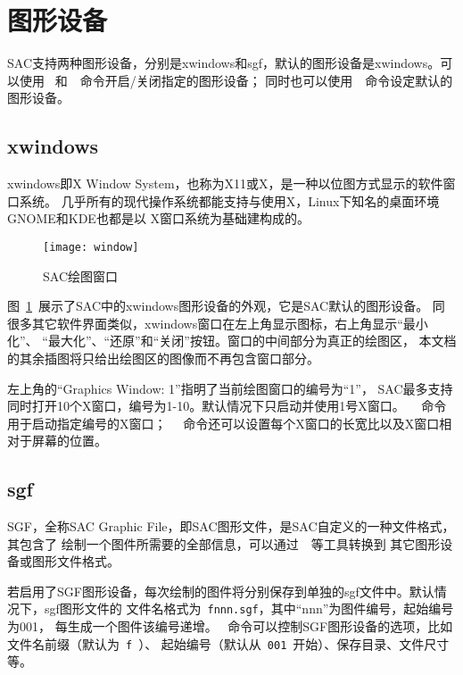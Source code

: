 \section{图形设备}
SAC支持两种图形设备，分别是xwindows和sgf，默认的图形设备是xwindows。可以使用
~和~~命令开启/关闭指定的图形设备；
同时也可以使用~~命令设定默认的图形设备。

\subsection{xwindows}
xwindows即X Window System，也称为X11或X，是一种以位图方式显示的软件窗口系统。
几乎所有的现代操作系统都能支持与使用X，Linux下知名的桌面环境GNOME和KDE也都是以
X窗口系统为基础建构成的。

\begin{figure}[H]
\centering
\texttt{[image: window]}
\caption{SAC绘图窗口}
\label{fig:plot}
\end{figure}

图~\ref{fig:plot}~展示了SAC中的xwindows图形设备的外观，它是SAC默认的图形设备。
同很多其它软件界面类似，xwindows窗口在左上角显示图标，右上角显示``最小化''、
``最大化''、``还原''和``关闭''按钮。窗口的中间部分为真正的绘图区，
本文档的其余插图将只给出绘图区的图像而不再包含窗口部分。

左上角的``Graphics Window: 1''指明了当前绘图窗口的编号为``1''，
SAC最多支持同时打开10个X窗口，编号为1-10。默认情况下只启动并使用1号X窗口。
~~命令用于启动指定编号的X窗口；
~~命令还可以设置每个X窗口的长宽比以及X窗口相对于屏幕的位置。

\subsection{sgf}
SGF，全称SAC Graphic File，即SAC图形文件，是SAC自定义的一种文件格式，其包含了
绘制一个图件所需要的全部信息，可以通过~~等工具转换到
其它图形设备或图形文件格式。

若启用了SGF图形设备，每次绘制的图件将分别保存到单独的sgf文件中。默认情况下，sgf图形文件的
文件名格式为~\verb+fnnn.sgf+，其中``nnn''为图件编号，起始编号为001，
每生成一个图件该编号递增。
~命令可以控制SGF图形设备的选项，比如文件名前缀（默认为~\verb+f+~）、
起始编号（默认从~\verb+001+~开始）、保存目录、文件尺寸等。
